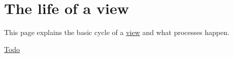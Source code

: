 \hypertarget{group__views__lifetime}{
\section{The life of a view}
\label{group__views__lifetime}
}
This page explains the basic cycle of a \hyperlink{classview}{view} and what processes happen.

\begin{Desc}
\item[\hyperlink{todo__todo000059}{Todo}]\end{Desc}
